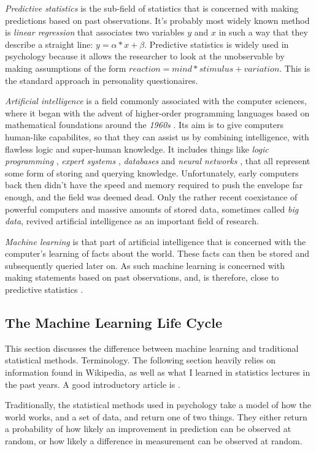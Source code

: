 \documentclass[a4paper,man,12pt,apacite]{apa6} %
\begin{document}
\emph{Predictive statistics} is the sub-field of statistics that is
concerned with making predictions based on past observations.
It's probably most widely known method is \emph{linear regression}
\cite{wpLR} that associates two variables \(y\) and \(x\) in such a way
that they describe a straight line: \(y = \alpha * x + \beta \).
Predictive statistics is widely used in psychology because it
allows the researcher to look at the unobservable by making
assumptions of the form \(reaction = mind * stimulus + variation\).
This is the standard approach in personality questionaires.

\emph{Artificial intelligence} is a field commonly associated with the
computer sciences, where it began with the advent of higher-order
programming languages based on mathematical foundations around the \emph{1960s} \cite{wpHOPL}.
Its aim is to give computers human-like capabilites, so that they can assist
us by combining intelligence, with flawless logic and super-human knowledge.
It includes things like \emph{logic programming} \cite{wpLP},
\emph{expert systems} \cite{wpES}, \emph{databases} \cite{wpDB} and
\emph{neural networks} \cite{wpNN}, that all represent some form of
storing and querying knowledge.
Unfortunately, early computers back then didn't have the speed and memory
required to push the envelope far enough, and the field was deemed dead.
Only the rather recent coexistance of powerful computers and massive amounts
of stored data, sometimes called \emph{big data}, revived artificial
intelligence as an important field of research.

\emph{Machine learning} is that part of artificial intelligence that
is concerned with the computer's learning of facts about the world.
These facts can then be stored and subsequently queried later on.
As such machine learning is concerned with making statements based
on past observations, and, is therefore, close to predictive statistics
\cite{wpML}.

\subsection{The Machine Learning Life Cycle}
This section discusses the difference between machine learning and traditional
statistical methods. Terminology.
The following section heavily relies on information found in Wikipedia, as
well as what I learned in statistics lectures in the past years.
A good introductory article is \cite{wpML}.

Traditionally, the statistical methods used in psychology
take a model of how the world works, and a set of data, and return one of
two things.
They either return a probability of how likely an improvement in prediction
can be observed at random, or how likely a difference in measurement can be
observed at random.
\end{document}
